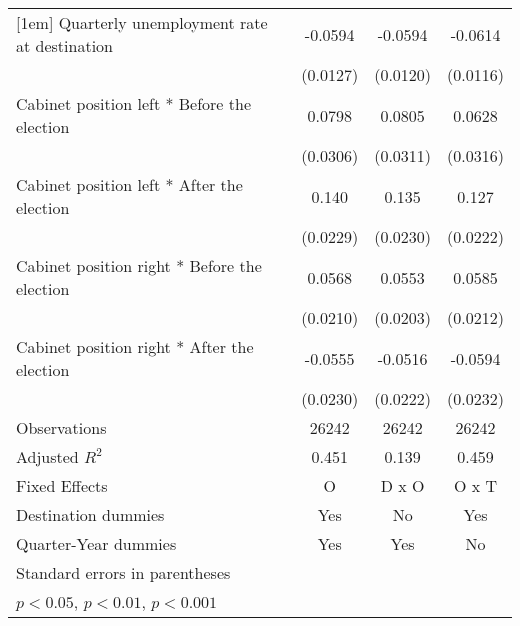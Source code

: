 \begin{table}[htbp]
\begin{tabular}{l*{3}{c}}
[1em]
Quarterly unemployment rate at destination&     -0.0594\sym{***}&     -0.0594\sym{***}&     -0.0614\sym{***}\\
                    &    (0.0127)         &    (0.0120)         &    (0.0116)         \\
[1em]
Cabinet position left * Before the election&      0.0798\sym{*}  &      0.0805\sym{*}  &      0.0628         \\
                    &    (0.0306)         &    (0.0311)         &    (0.0316)         \\
[1em]
Cabinet position left * After the election&       0.140\sym{***}&       0.135\sym{***}&       0.127\sym{***}\\
                    &    (0.0229)         &    (0.0230)         &    (0.0222)         \\
[1em]
Cabinet position right * Before the election&      0.0568\sym{**} &      0.0553\sym{**} &      0.0585\sym{**} \\
                    &    (0.0210)         &    (0.0203)         &    (0.0212)         \\
[1em]
Cabinet position right * After the election&     -0.0555\sym{*}  &     -0.0516\sym{*}  &     -0.0594\sym{*}  \\
                    &    (0.0230)         &    (0.0222)         &    (0.0232)         \\
\hline
Observations        &       26242         &       26242         &       26242         \\
Adjusted \(R^{2}\)  &       0.451         &       0.139         &       0.459         \\
Fixed Effects       &           O         &       D x O         &       O x T         \\
Destination dummies &         Yes         &          No         &         Yes         \\
Quarter-Year dummies&         Yes         &         Yes         &          No         \\
\hline\hline
\multicolumn{4}{l}{\footnotesize Standard errors in parentheses}\\
\multicolumn{4}{l}{\footnotesize \sym{*} \(p<0.05\), \sym{**} \(p<0.01\), \sym{***} \(p<0.001\)}\\
\end{tabular}
\end{table}
